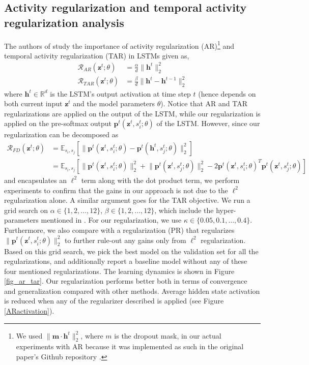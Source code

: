 \documentclass{article} %
\begin{document}
\subsection{Activity regularization and temporal activity regularization analysis} \label{subsec:ar_tar}
The authors of \cite{ar_tar} study the importance of activity regularization (AR)\footnote{We used $\lVert\mathbf{m \cdot h}^t\rVert_2^2$, where $m$ is the dropout mask, in our actual experiments with AR because it was implemented as such in the original paper's Github repository \cite{merity2017regularizing}.} and temporal activity regularization (TAR) in LSTMs given as,
\begin{align}
\mathcal{R}_{AR}(\mathbf{z}^{t}; \theta) &= \frac{\alpha}{d} \lVert \mathbf{h}^t \rVert_2^2\\
\mathcal{R}_{TAR}(\mathbf{z}^{t}; \theta) &= \frac{\beta}{d} \lVert \mathbf{h}^t - \mathbf{h}^{t-1} \rVert_2^2
\end{align}
where $\mathbf{h}^t \in \mathbb{R}^d$ is the LSTM's output activation at time step $t$ (hence depends on both current input $\mathbf{z}^{t}$ and the model parameters $\theta$). Notice that AR and TAR regularizations are applied on the output of the LSTM, while our regularization is applied on the pre-softmax output $\mathbf{p}^t(\mathbf{z}^{t}, s_i^t; \theta)$ of the LSTM. However, since our regularization can be decomposed as
\begin{align}
\mathcal{R}_{FD}(\mathbf{z}^{t}; \theta) &= \mathbb{E}_{s_i, s_j} \left[ \lVert \mathbf{p}^t(\mathbf{z}^{t}, s_i^t; \theta) - \mathbf{p}^t(\mathbf{h}^{t}, s_j^t; \theta) \rVert^2_2 \right]\\
&= \mathbb{E}_{s_i, s_j} \left[ \lVert \mathbf{p}^t(\mathbf{z}^{t}, s_i^t; \theta) \rVert^2_2  + \lVert \mathbf{p}^t(\mathbf{z}^{t}, s_j^t; \theta) \rVert^2_2 - 2 \mathbf{p}^t(\mathbf{z}^{t}, s_i^t; \theta)^T \mathbf{p}^t(\mathbf{z}^{t}, s_j^t; \theta)  \right]
\end{align}
and encapsulates an $\ell^2$ term along with the dot product term, we perform experiments to confirm that the gains in our approach is not due to the $\ell^2$ regularization alone. A similar argument goes for the TAR objective. We run a grid search on $\alpha \in \{ 1,2, \hdots,12 \}$, $\beta \in \{ 1,2, \hdots,12  \}$, which include the hyper-parameters mentioned in \cite{merity2017regularizing}. For our regularization, we use $\kappa \in \{ 0.05,0.1,\hdots,0.4 \}$. Furthermore, we also compare with a regularization (PR) that regularizes $\lVert \mathbf{p}^t(\mathbf{z}^{t}, s_i^t; \theta) \rVert_2^2$ to further rule-out any gains only from $\ell^2$ regularization. Based on this grid search, we pick the best model on the validation set for all the regularizations, and additionally report a baseline model without any of these four mentioned regularizations. The learning dynamics is shown in Figure \ref{fig_ar_tar}. Our regularization performs better both in terms of convergence and generalization compared with other methods. Average hidden state activation is reduced when any of the regularizer described is applied (see Figure \ref{ARactivation}).
\end{document}
